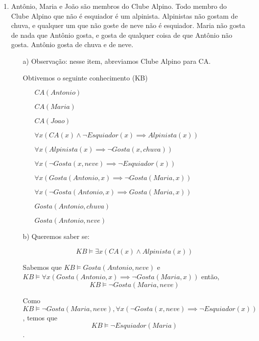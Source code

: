 \documentclass{article}
\begin{document}
\begin{enumerate}
    \item Antônio, Maria e João são membros do Clube Alpino. Todo membro do Clube Alpino que
    não é esquiador é um alpinista. Alpinistas não gostam de chuva, e qualquer um que não
    goste de neve não é esquiador. Maria não gosta de nada que Antônio gosta, e gosta de
    qualquer coisa de que Antônio não gosta. Antônio gosta de chuva e de neve.

    \begin{itemize}
        \item [a)] Observação: nesse item, abreviamos Clube Alpino para CA.
        
            Obtivemos o seguinte conhecimento (KB)

            \begin{itemize}
                \item [] $CA (Antonio)$
                \item [] $CA (Maria)$
                \item [] $CA (Joao)$
                \item [] $\forall x (CA(x) \land \neg Esquiador(x) \implies Alpinista(x))$
                \item [] $\forall x (Alpinista(x) \implies \neg Gosta (x, chuva))$
                \item [] $\forall x (\neg Gosta (x, neve) \implies \neg Esquiador (x))$
                \item [] $\forall x (Gosta (Antonio, x) \implies \neg Gosta (Maria, x))$
                \item [] $\forall x (\neg Gosta (Antonio, x) \implies Gosta (Maria, x))$
                \item [] $Gosta(Antonio, chuva)$
                \item [] $Gosta(Antonio, neve)$
            \end{itemize}
        
        \item [b)] Queremos saber se:
        
            $$KB \vDash \exists x (CA(x) \land Alpinista(x))$$

            Sabemos que $KB \vDash Gosta(Antonio, neve)$ e $KB \vDash \forall x (Gosta (Antonio, x) \implies \neg Gosta (Maria, x))$
            então, $$KB \vDash \neg Gosta(Maria, neve)$$

            Como $KB \vDash \neg Gosta(Maria, neve), \forall x (\neg Gosta (x, neve) \implies \neg Esquiador (x))$, temos que
            $$KB \vDash \neg Esquiador(Maria)$$.


\end{itemize}
\end{enumerate}
\end{document}
